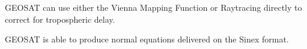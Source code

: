 \settowidth{\hangindent}{GEOSAT }
GEOSAT can use either the Vienna Mapping Function or Raytracing
directly to correct for tropospheric delay.

\settowidth{\hangindent}{GEOSAT }
GEOSAT is able to produce normal equations delivered on the Sinex
format.

\endinput
